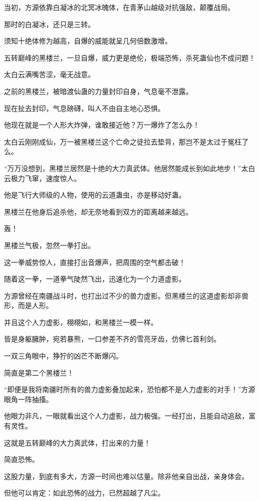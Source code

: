 \begin{this_body}
当初，方源依靠白凝冰的北冥冰魄体，在青茅山越级对抗强敌，颠覆战局。

那时的白凝冰，还只是三转。

须知十绝体修为越高，自爆的威能就呈几何倍数激增。

五转巅峰的黑楼兰，一旦自爆，威力更是绝伦，极端恐怖，杀死蛊仙也不成问题！

太白云满嘴苦涩，毫无战意。

之前的黑楼兰，被暗渡仙蛊的力量封印自身，气息毫不泄露。

现在扯去封印，气息磅礴，叫人不由自主地心恐惧。

他现在就是一个人形大炸弹，谁敢接近他？万一爆炸了怎么办！

太白云刚刚成仙，万一被黑楼兰这个亡命之徒拉去垫背，那岂不是太过于冤枉了么。

“万万没想到，黑楼兰居然是十绝的大力真武体。他居然能成长到如此地步！”太白云极力飞窜，速度惊人。

他是飞行大师级的人物，使用的云道蛊虫，亦是移动好蛊。

黑楼兰在他身后追杀他，却无奈地看到双方的距离越来越远。

轰！

黑楼兰气极，忽然一拳打出。

这一拳威势惊人，直接打出音爆声，把周围的空气都击破！

随着这一拳，一道拳气陡然飞出，迅速化为一个力道虚影。

方源曾经在南疆战斗时，也打出过不少的兽力虚影。但黑楼兰的这道虚影却非兽形，而是人形。

并且这个人力虚影，栩栩如，和黑楼兰一模一样。

皆是身躯臃肿，宛若暴熊，一口参差不齐的雪亮牙齿，仿佛匕首利剑。

一双三角眼中，狰狞的凶芒不断爆闪。

简直是第二个黑楼兰！

“即便是我将南疆时所有的兽力虚影叠加起来，恐怕都不是人力虚影的对手！”方源眼角一阵抽搐。

他眼力非凡，一眼就看出这个人力虚影，战力极强。一经打出，且能自动追敌，富有灵性。

这就是五转巅峰的大力真武体，打出来的力量！

简直恐怖。

这股力量，到底有多大，方源一时间也难以估量。除非他亲自出战，亲身体会。

但他可以肯定：如此恐怖的战力，已然超越了凡尘。


\end{this_body}
